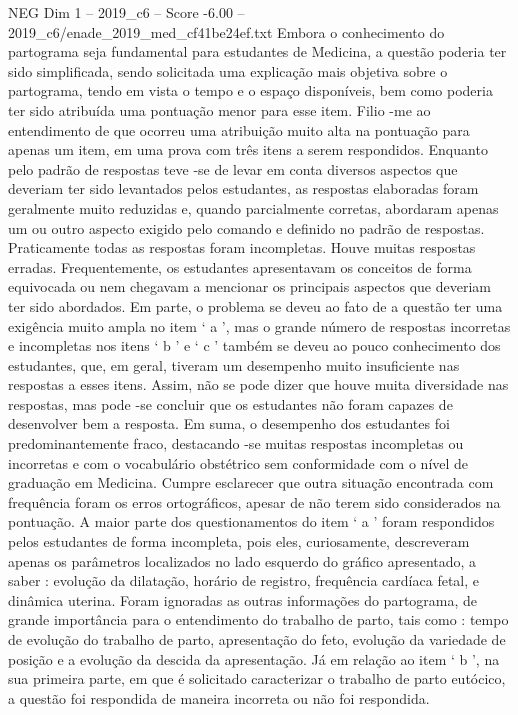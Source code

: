\begin{textsample}{NEG Dim 1 – 2019\_c6 – Score -6.00 – 2019\_c6/enade\_2019\_med\_cf41be24ef.txt}
Embora o conhecimento do partograma seja fundamental para estudantes de Medicina, a questão poderia ter sido simplificada, sendo solicitada uma explicação mais objetiva sobre o partograma, tendo em vista o tempo e o espaço disponíveis, bem como poderia ter sido atribuída uma pontuação menor para esse item.
Filio -me ao entendimento de que ocorreu uma atribuição muito alta na pontuação para apenas um item, em uma prova com três itens a serem respondidos.
Enquanto pelo padrão de respostas teve -se de levar em conta diversos aspectos que deveriam ter sido levantados pelos estudantes, as respostas elaboradas foram geralmente muito reduzidas e, quando parcialmente corretas, abordaram apenas um ou outro aspecto exigido pelo comando e definido no padrão de respostas.
Praticamente todas as respostas foram incompletas.
Houve muitas respostas erradas.
Frequentemente, os estudantes apresentavam os conceitos de forma equivocada ou nem chegavam a mencionar os principais aspectos que deveriam ter sido abordados.
Em parte, o problema se deveu ao fato de a questão ter uma exigência muito ampla no item ‘ a ’, mas o grande número de respostas incorretas e incompletas nos itens ‘ b ’ e ‘ c ’ também se deveu ao pouco conhecimento dos estudantes, que, em geral, tiveram um desempenho muito insuficiente nas respostas a esses itens.
Assim, não se pode dizer que houve muita diversidade nas respostas, mas pode -se concluir que os estudantes não foram capazes de desenvolver bem a resposta.
Em suma, o desempenho dos estudantes foi predominantemente fraco, destacando -se muitas respostas incompletas ou incorretas e com o vocabulário obstétrico sem conformidade com o nível de graduação em Medicina.
Cumpre esclarecer que outra situação encontrada com frequência foram os erros ortográficos, apesar de não terem sido considerados na pontuação.
A maior parte dos questionamentos do item ‘ a ’ foram respondidos pelos estudantes de forma incompleta, pois eles, curiosamente, descreveram apenas os parâmetros localizados no lado esquerdo do gráfico apresentado, a saber : evolução da dilatação, horário de registro, frequência cardíaca fetal, e dinâmica uterina.
Foram ignoradas as outras informações do partograma, de grande importância para o entendimento do trabalho de parto, tais como : tempo de evolução do trabalho de parto, apresentação do feto, evolução da variedade de posição e a evolução da descida da apresentação.
Já em relação ao item ‘ b ’, na sua primeira parte, em que é solicitado caracterizar o trabalho de parto eutócico, a questão foi respondida de maneira incorreta ou não foi respondida.

\end{textsample}
